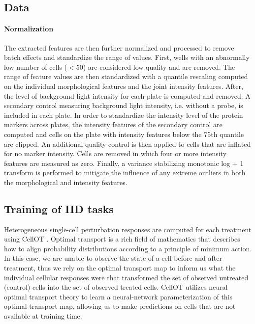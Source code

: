 \subsection{Data}

\paragraph{Normalization}
The extracted features are then further normalized and processed to remove batch effects and standardize the range of values. First, wells with an abnormally low number of cells ($< 50$) are considered low-quality and are removed. The range of feature values are then standardized with a quantile rescaling computed on the individual morphological features and the joint intensity features. After, the level of background light intensity for each plate is computed and removed. A secondary control measuring background light intensity, i.e. without a probe, is included in each plate. In order to standardize the intensity level of the protein markers across plates, the intensity features of the secondary control are computed and cells on the plate with intensity features below the 75th quantile are clipped. An additional quality control is then applied to cells that are inflated for no marker intensity. Cells are removed in which four or more intensity features are measured as zero. Finally, a variance stabilizing monotonic log + 1 transform is performed to mitigate the influence of any extreme outliers in both the morphological and intensity features.


\subsection{Training of IID tasks}
Heterogeneous single-cell perturbation responses are computed for each treatment using CellOT \cite{bunne2023}. Optimal transport is a rich field of mathematics that describes how to align probability distributions according to a principle of minimum action. In this case, we are unable to observe the state of a cell before and after treatment, thus we rely on the optimal transport map to inform us what the individual cellular responses were that transformed the set of observed untreated (control) cells into the set of observed treated cells. CellOT utilizes neural optimal transport theory to learn a neural-network parameterization of this optimal transport map, allowing us to make predictions on cells that are not available at training time.

